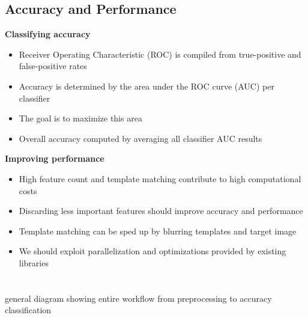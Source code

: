 \documentclass[t, xcolor={dvipsnames}]{beamer}
\begin{document}
\subsection{Accuracy and Performance}
\begin{frame}[fragile]
  \vspace{0.5cm}
  {\bfseries\Large Classifying accuracy}
  \vspace{0.5cm}
  \begin{addmargin}{0.5cm}
    \begin{itemize}
      \item Receiver Operating Characteristic (ROC) is compiled from true-positive and false-positive rates
      \item Accuracy is determined by the area under the ROC curve (AUC) per classifier
      \item The goal is to maximize this area
      \item Overall accuracy computed by averaging all classifier AUC results
    \end{itemize}
  \end{addmargin}
\end{frame}

\begin{frame}[fragile]
  \vspace{0.5cm}
  {\bfseries\Large Improving performance}
  \vspace{0.5cm}
  \begin{addmargin}{0.5cm}
    \begin{itemize}
      \item High feature count and template matching contribute to high computational costs
      \item Discarding less important features should improve accuracy and performance
      \item Template matching can be sped up by blurring templates and target image
      \item We should exploit parallelization and optimizations provided by existing libraries
    \end{itemize}
  \end{addmargin}
\end{frame}



\section{}
\begin{frame}[fragile]
  general diagram showing entire workflow from preprocessing to accuracy classification
\end{frame}
\end{document}
